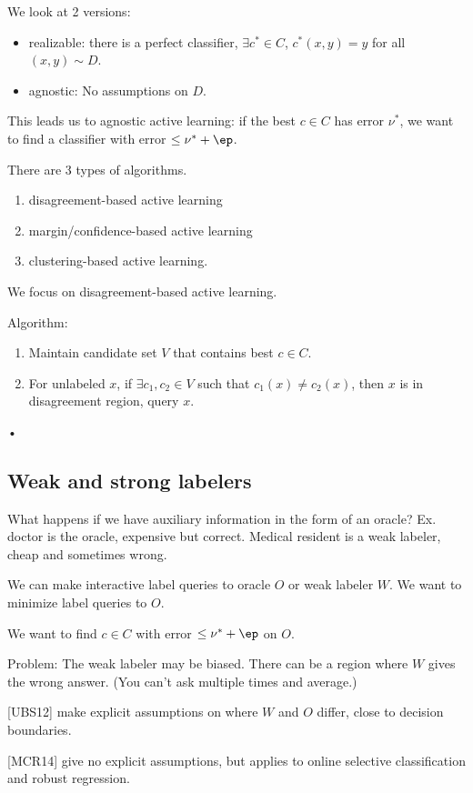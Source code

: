 We look at 2 versions: 
\begin{itemize}
\item
realizable: there is a perfect classifier, $\exists c^*\in C$, $c^*(x,y)=y$ for all $(x,y)\sim D$.
\item
agnostic: No assumptions on $D$.
\end{itemize}

This leads us to agnostic active learning: if the best $c\in C$ has error $\nu^*$, we want to find a classifier with error $\le \nu^*+\ep$. 

There are 3 types of algorithms.
\begin{enumerate}
\item
disagreement-based active learning
\item
margin/confidence-based active learning
\item
clustering-based active learning.
\end{enumerate}
We focus on disagreement-based active learning.

Algorithm:
\begin{enumerate}
\item
Maintain candidate set $V$ that contains best $c\in C$.
\item
For unlabeled $x$, if $\exists c_1,c_2\in V$ such that $c_1(x)\ne c_2(x)$, then $x$ is in disagreement region, query $x$.
\end{enumerate}•


\subsection{Weak and strong labelers}

What happens if we have auxiliary information in the form of an oracle? Ex. doctor is the oracle, expensive but correct. Medical resident is a weak labeler, cheap and sometimes wrong.

We can make interactive label queries to oracle $O$ or weak labeler $W$. We want to minimize label queries to $O$.

We want to find $c\in C$ with error $\le \nu^*+\ep$ on $O$.

Problem: The weak labeler may be biased. There can be a region where $W$ gives the wrong answer. (You can't ask multiple times and average.)

[UBS12] make explicit assumptions on where $W$ and $O$ differ, close to decision boundaries.

[MCR14] give no explicit assumptions, but applies to online selective classification and robust regression.

